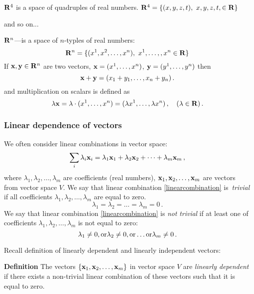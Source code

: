 \documentclass[12pt]{article}
\numberwithin{equation}{section}
\begin{document}
\noindent    ${\bf R}^4$ is a space of quadruples  of real numbers. ${\bf R}^4=\{(x,y,z,t),\,\,x,y,z,t,\in {\bf R} \}$

  \centerline {and so on...}
  ${\bf R}^n$---is a space of $n$-typles of real numbers:
                    \begin{equation}
\label{basisexampleofvectorspace}
         {\bf R}^n=\{(x^1,x^2,\dots,x^n),\,\,x^1,\dots,,x^n\in {\bf R} \}
                     \end{equation}
  If  ${\bf x},{\bf y}\in {\bf R}^n$ are two vectors, ${\bf x}=(x^1,\dots,x^n)$, ${\bf y}=(y^1,\dots,y^n)$
then             $$
        {\bf x}+{\bf y}=(x_1+y_1,\dots,x_n+y_n)\,.
                 $$ and
multiplication on scalars is defined as
           $$
\lambda{\bf x}=\lambda \cdot (x^1,\dots,x^n)=(\lambda x^1,\dots,\lambda x^n)\,,\quad (\lambda\in {\bf R})\,.
           $$





\subsubsection{Linear dependence of vectors}



We often consider linear combinations  in vector space:
           \begin{equation}\label{linearcombination}
            \sum_i\lambda_i{\bf x}_i=\lambda_1{\bf x}_1+\lambda_2{\bf x}_2+\dots+\lambda_m{\bf x}_m\,,
           \end{equation}
          where $\lambda_1,\lambda_2,\dots,\lambda_m$ are coefficients (real numbers),
          ${\bf x}_1,{\bf x}_2,\dots,{\bf x}_m$ are vectors from vector space $V$.
We say that linear combination \eqref{linearcombination} is {\it \,trivial\,} if all coefficients $\lambda_1,\lambda_2,\dots,\lambda_m$ are equal to zero.
              $$
               \lambda_1=\lambda_2=\dots=\lambda_m=0\,.
               $$
We say that linear combination \eqref{linearcombination} is {\it not trivial} if at least one of  coefficients $\lambda_1,\lambda_2,\dots,\lambda_m$ is not equal to zero:
                    $$
         \lambda_1\not=0, {\rm or}\lambda_2\not=0,{\rm or}\dots {\rm or} \lambda_m\not=0\,.
                    $$

Recall definition of linearly dependent and linearly independent vectors:

{\bf Definition} The vectors $\{{\bf x}_1,{\bf x}_2,\dots,{\bf x}_m\}$ in vector space $V$ are {\it linearly dependent\,}
if there exists a non-trivial linear combination of these vectors such that it is equal to zero.
\end{document}
